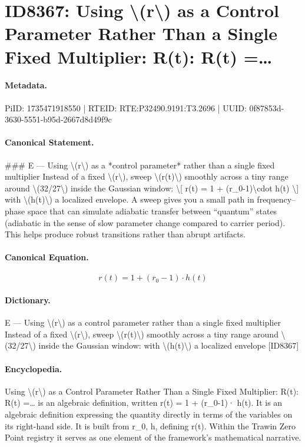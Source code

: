\section*{ID8367: Using \textbackslash{}(r\textbackslash{}) as a Control Parameter Rather Than a Single Fixed Multiplier: R(t): R(t) =…}
\paragraph{Metadata.}
PiID: 1735471918550 | RTEID: RTE:P32490.9191:T3.2696 | UUID: 0f87853d-3630-5551-b95d-2667d8d49f9c

\paragraph{Canonical Statement.}
\#\#\# E — Using \textbackslash{}(r\textbackslash{}) as a *control parameter* rather than a single fixed multiplier Instead of a fixed \textbackslash{}(r\textbackslash{}), sweep \textbackslash{}(r(t)\textbackslash{}) smoothly across a tiny range around \textbackslash{}(32/27\textbackslash{}) inside the Gaussian window: \textbackslash{}[ r(t) = 1 + (r\_0-1)\textbackslash{}cdot h(t) \textbackslash{}] with \textbackslash{}(h(t)\textbackslash{}) a localized envelope. A sweep gives you a small path in frequency–phase space that can simulate adiabatic transfer between “quantum” states (adiabatic in the sense of slow parameter change compared to carrier period). This helps produce robust transitions rather than abrupt artifacts.

\paragraph{Canonical Equation.}
\[
r(t) = 1 + (r_0-1)\cdot h(t)
\]

\paragraph{Dictionary.}
E — Using \textbackslash{}(r\textbackslash{}) as a control parameter rather than a single fixed multiplier Instead of a fixed \textbackslash{}(r\textbackslash{}), sweep \textbackslash{}(r(t)\textbackslash{}) smoothly across a tiny range around \textbackslash{}(32/27\textbackslash{}) inside the Gaussian window: with \textbackslash{}(h(t)\textbackslash{}) a localized envelope [ID8367]

\paragraph{Encyclopedia.}
Using \textbackslash{}(r\textbackslash{}) as a Control Parameter Rather Than a Single Fixed Multiplier: R(t): R(t) =… is an algebraic definition, written r(t) = 1 + (r\_0-1)· h(t). It is an algebraic definition expressing the quantity directly in terms of the variables on its right-hand side. It is built from r\_0, h, defining r(t). Within the Trawin Zero Point registry it serves as one element of the framework's mathematical narrative.

